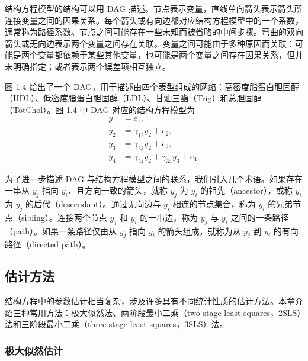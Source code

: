 结构方程模型的结构可以用 DAG 描述。节点表示变量，直线单向箭头表示箭头所连接变量之间的因果关系。每个箭头或有向边都对应结构方程模型中的一个系数，通常称为路径系数。节点之间可能存在一些未知而被省略的中间步骤。弯曲的双向箭头或无向边表示两个变量之间存在关联。变量之间可能由于多种原因而关联：可能是两个变量都依赖于某些其他变量，也可能是两个变量之间存在因果关系，但并未明确指定；或者表示两个误差项相互独立。

图 1.4 给出了一个 DAG，用于描述由四个表型组成的网络：高密度脂蛋白胆固醇（HDL）、低密度脂蛋白胆固醇（LDL）、甘油三酯（Trig）和总胆固醇（TotChol）。图 1.4 中 DAG 对应的结构方程模型为
\begin{equation}
 \begin{aligned}
  y_1&=e_1,\\
  y_2&=\gamma_{12}y_2+e_2,\\
  y_3&=\gamma_{23}y_2+e_3,\\
  y_4&=\gamma_{24}y_2+\gamma_{34}y_3+e_4.
 \end{aligned}
 \tag{1.54}
\end{equation}
\begin{figure}[htbp]
 \centering
 
 \label{fig:ch01b-phenotype-network}
\end{figure}

为了进一步描述 DAG 与结构方程模型之间的联系，我们引入几个术语。如果存在一串从 $y_j$ 指向 $y_i$、且方向一致的箭头，就称 $y_j$ 为 $y_i$ 的祖先（ancestor），或称 $y_i$ 为 $y_j$ 的后代（descendant）。通过无向边与 $y_i$ 相连的节点集合，称为 $y_i$ 的兄弟节点（sibling）。连接两个节点 $y_j$ 和 $y_i$ 的一串边，称为 $y_j$ 与 $y_i$ 之间的一条路径（path）。如果一条路径仅由从 $y_j$ 指向 $y_i$ 的箭头组成，就称为从 $y_j$ 到 $y_i$ 的有向路径（directed path）。

\subsection{估计方法}
\label{sec:ch01b-estimation}

结构方程中的参数估计相当复杂，涉及许多具有不同统计性质的估计方法。本章介绍三种常用方法：极大似然法、两阶段最小二乘（two-stage least squares，2SLS）法和三阶段最小二乘（three-stage least squares，3SLS）法。

\subsubsection{极大似然估计}

